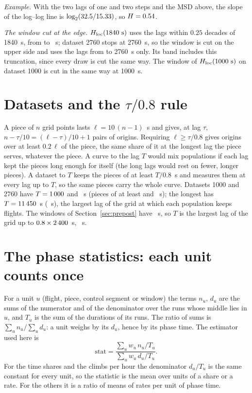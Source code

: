 \emph{Example.} With the two lags of one and two steps and the MSD above, the slope of the log--log line is $\log_2(32.5/15.33)$, so $H=0.54$.

\emph{The window cut at the edge.} $H_\mathrm{loc}(1840~\mathrm{s})$ uses the lags within $0.25$ decades of 1840~s, from \HqLowest{} to \HqHighest~s; dataset 2760 stops at 2760~s, so the window is cut on the upper side and uses the lags from \HqLowest{} to 2760~s only.
Its band includes this truncation, since every draw is cut the same way. The window of $H_\mathrm{loc}(1000~\mathrm{s})$ on dataset 1000 is cut in the same way at 1000~s.

\section{Datasets and the \texorpdfstring{$\tau/0.8$}{tau/0.8} rule}\label{app:datasets}

A piece of $n$ grid points lasts $\ell=10\,(n-1)$~s and gives, at lag $\tau$, $n-\tau/10=(\ell-\tau)/10+1$ pairs of origins. Requiring $\ell\ge\tau/0.8$ gives origins over at least $0.2\,\ell$ of the piece, the same share of it at the longest lag the piece serves, whatever the piece.
A curve to the lag $T$ would mix populations if each lag kept the pieces long enough for itself (the long lags would rest on fewer, longer pieces). A dataset to $T$ keeps the pieces of at least $T/0.8$~s and measures them
at every lag up to $T$, so the same pieces carry the whole curve. Datasets 1000 and 2760 have $T=1\,000$ and \RawTauTwo~s (pieces of at least \RawShortestOne{} and \RawShortestTwo~s); the longest has $T=11\,450$~s (\RawShortestLong~s),
the largest lag of the grid at which each population keeps \DeclMinFlights{} flights. The windows of Section~\ref{sec:prepost} have \PreWindow~s, so $T$ is the largest lag of the grid up to $0.8\times2\,400$~s, \PreMaxLag~s.

\section{The phase statistics: each unit counts once}\label{app:phases}

For a unit $u$ (flight, piece, control segment or window) the terms $n_u$, $d_u$ are the sums of the numerator and of the denominator over the runs whose middle lies in $u$, and $T_u$ is the sum of the durations of its runs.
The ratio of sums is $\sum_u n_u/\sum_u d_u$: a unit weighs by its $d_u$, hence by its phase time. The estimator used here is
\[
  \text{stat}=\frac{\sum_u w_u\,n_u/T_u}{\sum_u w_u\,d_u/T_u}.
\]
For the time shares and the climbs per hour the denominator $d_u/T_u$ is the same constant for every unit, so the statistic is the mean over units of a share or a rate. For the others it is a ratio of means of rates per unit of phase time.

